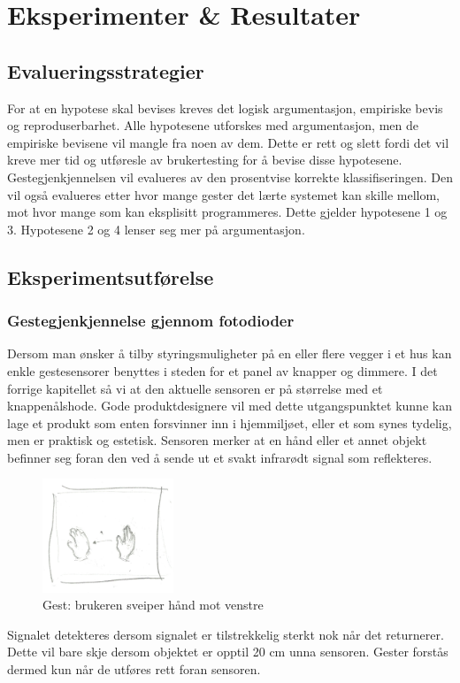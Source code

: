 \section[Eksperimenter \& Resultater]{Eksperimenter \& Resultater}
\subsection{Evalueringsstrategier}
For at en hypotese skal bevises kreves det logisk argumentasjon, empiriske bevis og reproduserbarhet. Alle hypotesene utforskes med argumentasjon, men de empiriske bevisene vil mangle fra noen av dem. Dette er rett og slett fordi det vil kreve mer tid og utføresle av brukertesting for å bevise disse hypotesene. Gestegjenkjennelsen vil evalueres av den prosentvise korrekte klassifiseringen. Den vil også evalueres etter hvor mange gester det lærte systemet kan skille mellom, mot hvor mange som kan eksplisitt programmeres. Dette gjelder hypotesene 1 og 3. Hypotesene 2 og 4 lenser seg mer på argumentasjon.

\subsection{Eksperimentsutførelse}

\subsubsection*{Gestegjenkjennelse gjennom fotodioder}
Dersom man ønsker å tilby styringsmuligheter på en eller flere vegger i et hus kan enkle gestesensorer benyttes i steden for et panel av knapper og dimmere. I det forrige kapitellet så vi at den aktuelle sensoren er på størrelse med et knappenålshode. Gode produktdesignere vil med dette utgangspunktet kunne kan lage et produkt som enten forsvinner inn i hjemmiljøet, eller et som synes tydelig, men er praktisk og estetisk. Sensoren merker at en hånd eller et annet objekt befinner seg foran den ved å sende ut et svakt infrarødt signal som reflekteres.
\begin{figure}
    \vspace{-20pt}
  \begin{center}
    \includegraphics[width=0.35\textwidth]{fig/swipe-l-r}
  \end{center}
  \vspace{-20pt}
  \caption{Gest: brukeren sveiper hånd mot venstre}
  \label{fig:gest}
  \vspace{-7pt}
\end{figure}
Signalet detekteres dersom signalet er tilstrekkelig sterkt nok når det returnerer. Dette vil bare skje dersom objektet er opptil 20 cm unna sensoren. Gester forstås dermed kun når de utføres rett foran sensoren.

